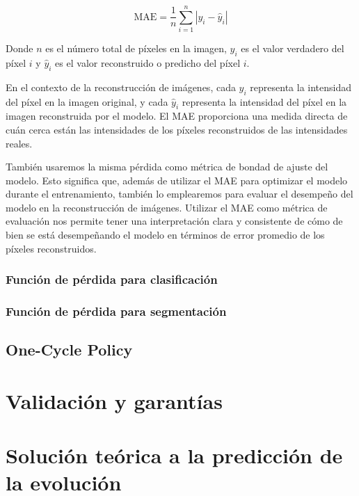 $$ \text{MAE} = \frac{1}{n} \sum_{i=1}^{n} \left| y_i - \hat{y}_i \right| $$ 

Donde $n$ es el número total de píxeles en la imagen, $y_i$ es el valor verdadero del píxel $i$ y $\hat{y}_i$ es el valor reconstruido o predicho del píxel $i$.

En el contexto de la reconstrucción de imágenes, cada $y_i$ representa la intensidad del píxel en la imagen original, y cada $\hat{y}_i$ representa la intensidad del píxel en la imagen reconstruida por el modelo. El MAE proporciona una medida directa de cuán cerca están las intensidades de los píxeles reconstruidos de las intensidades reales.

También usaremos la misma pérdida como métrica de bondad de ajuste del modelo. Esto significa que, además de utilizar el MAE para optimizar el modelo durante el entrenamiento, también lo emplearemos para evaluar el desempeño del modelo en la reconstrucción de imágenes. Utilizar el MAE como métrica de evaluación nos permite tener una interpretación clara y consistente de cómo de bien se está desempeñando el modelo en términos de error promedio de los píxeles reconstruidos.

\subsubsection{Función de pérdida para clasificación}

\subsubsection{Función de pérdida para segmentación}

\subsection{One-Cycle Policy}


\section{Validación y garantías}

\section{Solución teórica a la predicción de la evolución}